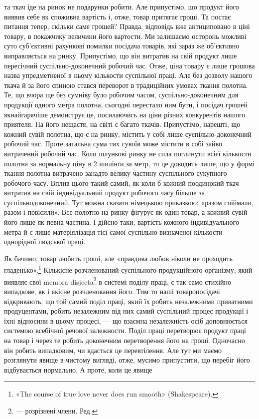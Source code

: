та ткач іде на ринок не подарунки робити. Але припустімо, що
продукт його виявив себе як споживна вартість і, отже, товар
притягає гроші. Та постає питання тепер, скільки саме грошей?
Правда, відповідь вже антициповано в ціні товару, в покажчику
величини його вартости. Ми залишаємо осторонь можливі суто
суб’єктивні рахункові помилки посідача товарів, які зараз же
об’єктивно виправляється на ринку. Припустімо, що він витратив
на свій продукт лише пересічний суспільно-доконечний
робочий час. Отже, ціна товару є лише грошова назва упредметненої
в ньому кількости суспільної праці. Але без дозволу нашого
ткача й за його спиною стався переворот в традиційних умовах
ткання полотна. Те, що вчора ще без сумніву було робочим часом,
суспільно-доконечним для продукції одного метра полотна,
сьогодні перестало ним бути, і посідач грошей якнайгарячіше
демонструє це, посилаючись на ціни різних конкурентів нашого
приятеля. На його нещастя, на світі є багато ткачів. Припустімо,
нарешті, що кожний сувій полотна, що є на ринку, містить у
собі лише суспільно-доконечний робочий час. Проте загальна
сума тих сувоїв може містити в собі зайво витрачений робочий
час. Коли шлункові ринку не сила поглинути всієї кількости
полотна за нормальну ціну в 2 шилінґи за метр, то це доводить
лише, що у формі ткання полотна витрачено занадто велику
частину суспільного сукупного робочого часу. Вплив цього
такий самий, як коли б кожний поодинокий ткач витратив на
свій індивідуальний продукт робочого часу більше за суспільнодоконечний.
Тут можна сказати німецькою приказкою: «разом
спіймали, разом і повісили». Все полотно на ринку фігурує як
один товар, а кожний сувій його лише як певна частина. І дійсно
таки, вартість кожного індивідуального метра й є лише матеріялізація
тієї самої суспільно визначеної кількости однорідної
людської праці.

Як бачимо, товар любить гроші, але «правдива любов ніколи
не проходить гладенько».\footnote*{
«The course of true love never does run smooth» (Shakespeare).
} Кількісне розчленований суспільного
продукційного організму, який виявляє свої membra disjecta\footnote*{
— розрізнені члени. Ред.
}
в системі поділу праці, є так само стихійно випадкове, як і якісне
розчленовання його. Тим то наші товаропосідачі відкривають, що
той самий поділ праці, який їх робить незалежними приватними
продуцентами, робить незалежним від них самий суспільний процес
продукції і їхні відносини в цьому процесі, — що взаємна
незалежність осіб доповнюється системою всебічної речової залежности.
Поділ праці перетворює продукт праці на товар і через те
робить доконечним перетворення його на гроші. Одночасно він
робить випадковим, чи вдасться це перевтілення. Але тут ми маємо
розглянути явище в чистому вигляді, отже, мусимо припустити,
що перебіг його відбувається нормально. А проте, коли це явище